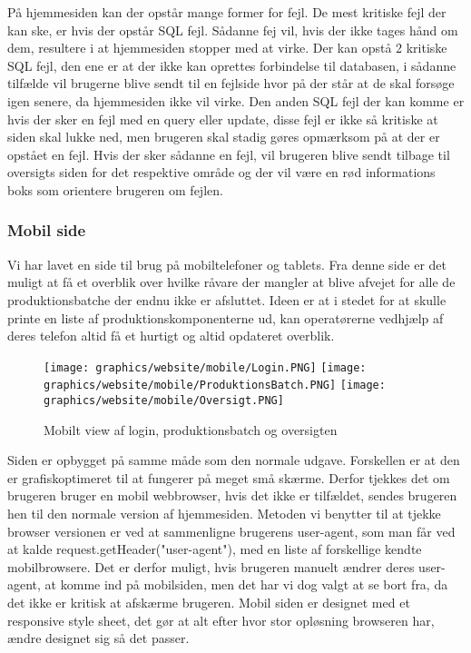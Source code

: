 \documentclass[a4paper]{article}
\newenvironment{changemargin}[2]{%
\begin{list}{}{%
\setlength{\topsep}{0pt}%
\setlength{\leftmargin}{#1}%
\setlength{\rightmargin}{#2}%
\setlength{\listparindent}{\parindent}%
\setlength{\itemindent}{\parindent}%
\setlength{\parsep}{\parskip}%
}%
\item[]}{\end{list}}
\begin{document}
På hjemmesiden kan der opstår mange former for fejl. De mest kritiske fejl der kan ske, er hvis der opstår SQL fejl. Sådanne fej vil, hvis der ikke tages hånd om dem, resultere i at hjemmesiden stopper med at virke. Der kan opstå 2 kritiske SQL fejl, den ene er at der ikke kan oprettes forbindelse til databasen, i sådanne tilfælde vil brugerne blive sendt til en fejlside hvor på der står at de skal forsøge igen senere, da hjemmesiden ikke vil virke. Den anden SQL fejl der kan komme er hvis der sker en fejl med en query eller update, disse fejl er ikke så kritiske at siden skal lukke ned, men brugeren skal stadig gøres opmærksom på at der er opstået en fejl. Hvis der sker sådanne en fejl, vil brugeren blive sendt tilbage til oversigts siden for det respektive område og der vil være en rød informations boks som orientere brugeren om fejlen.


\subsubsection{Mobil side} %

Vi har lavet en side til brug på mobiltelefoner og tablets. Fra denne side er det muligt at få et overblik over hvilke råvare der mangler at blive afvejet for alle de produktionsbatche der endnu ikke er afsluttet. Ideen er at i stedet for at skulle printe en liste af produktionskomponenterne ud, kan operatørerne vedhjælp af deres telefon altid få et hurtigt og altid opdateret overblik. 

\begin{figure}[H]
\begin{changemargin}{-1.2cm}{-1.2cm}
  \texttt{[image: graphics/website/mobile/Login.PNG]}
  \texttt{[image: graphics/website/mobile/ProduktionsBatch.PNG]}
  \texttt{[image: graphics/website/mobile/Oversigt.PNG]}
  \caption{Mobilt view af login, produktionsbatch og oversigten}
\end{changemargin}
\end{figure}

Siden er opbygget på samme måde som den normale udgave. Forskellen er at den er grafiskoptimeret til at fungerer på meget små skærme. Derfor tjekkes det om brugeren bruger en mobil webbrowser, hvis det ikke er tilfældet, sendes brugeren hen til den normale version af hjemmesiden. Metoden vi benytter til at tjekke browser versionen er ved at sammenligne brugerens user-agent, som man får ved at kalde request.getHeader("user-agent"), med en liste af forskellige kendte mobilbrowsere. Det er derfor muligt, hvis brugeren manuelt ændrer deres user-agent, at komme ind på mobilsiden, men det har vi dog valgt at se bort fra, da det ikke er kritisk at afskærme brugeren.  Mobil siden er designet med et responsive style sheet, det gør at alt efter hvor stor opløsning browseren har, ændre designet sig så det passer.
\end{document}
